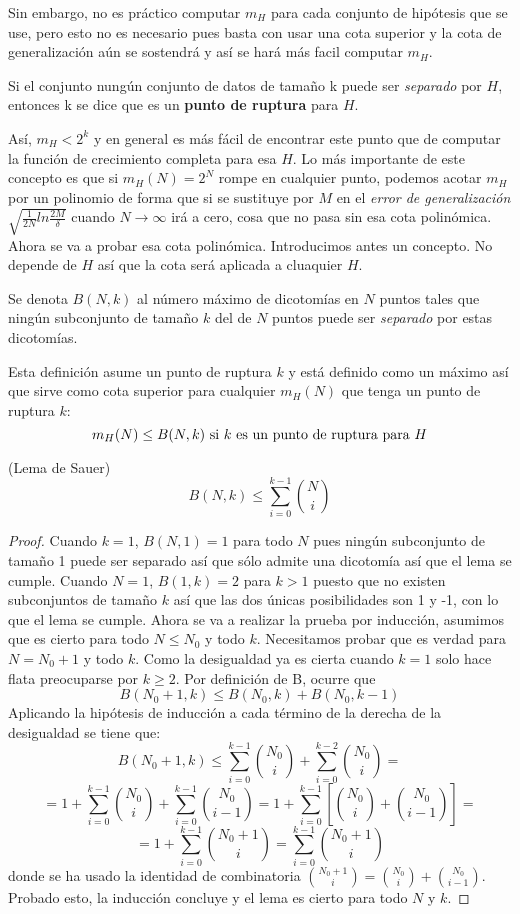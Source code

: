 Sin embargo, no es práctico computar $m_{H}$ para cada conjunto de hipótesis que se use, pero esto no es necesario pues basta con usar una cota superior y la cota de generalización aún se sostendrá y así se hará más facil computar $m_{H}$. \cite{abu2012learning}
\begin{definicion}
Si el conjunto nungún conjunto de datos de tamaño k puede ser \textit{separado} por $H$, entonces k se dice que es un \textbf{punto de ruptura} para $H$.
\end{definicion}
Así, $m_{H} < 2^{k}$ y en general es más fácil de encontrar este punto que de computar la función de crecimiento completa para esa $H$. Lo más importante de este concepto es que si $m_{H}(N)=2^{N}$ rompe en cualquier punto, podemos acotar $m_{H}$ por un polinomio de forma que si se sustituye por $M$ en el \textit{error de generalización} $\sqrt{\frac{1}{2N}ln\frac{2M}{\delta}}$ cuando $N \longrightarrow \infty$ irá a cero, cosa que no pasa sin esa cota polinómica.\\
Ahora se va a probar esa cota polinómica. Introducimos antes un concepto. No depende de $H$ así que la cota será aplicada a cluaquier $H$.
\begin{definicion}
Se denota $B(N,k)$ al número máximo de dicotomías en $N$ puntos tales que ningún subconjunto de tamaño $k$ del de $N$ puntos puede ser \textit{separado} por estas dicotomías.
\end{definicion}
Esta definición asume un punto de ruptura $k$ y está definido como un máximo así que sirve como cota superior para cualquier $m_{H}(N)$ que tenga un punto de ruptura $k$:
\[ m_{H}(N) \leq B(N,k) \textnormal{ si } k \textnormal{ es un punto de ruptura para } H\]
\begin{lema}
(Lema de Sauer) \[ B(N,k) \leq \sum_{i=0}^{k-1} \binom{N}{i} \]
\end{lema}
\begin{proof}
Cuando $k=1$, $B(N,1)=1$ para todo $N$ pues ningún subconjunto de tamaño 1 puede ser separado así que sólo admite una dicotomía así que el lema se cumple. Cuando $N=1$, $B(1,k)=2$ para $k>1$ puesto que no existen subconjuntos de tamaño $k$ así que las dos únicas posibilidades son 1 y -1, con lo que el lema se cumple. Ahora se va a realizar la prueba por inducción, asumimos que es cierto para todo $N \leq N_{0}$ y todo $k$. Necesitamos probar que es verdad para $N=N_{0}+1$ y todo $k$. Como la desigualdad ya es cierta cuando $k=1$ solo hace flata preocuparse por $k \geq 2$. Por definición de B, ocurre que
\[ B(N_{0}+1,k) \leq B(N_{0},k)+B(N_{0},k-1) \]
Aplicando la hipótesis de inducción a cada término de la derecha de la desigualdad se tiene que:
\[ B(N_{0}+1,k) \leq \sum_{i=0}^{k-1} \binom{N_{0}}{i} + \sum_{i=0}^{k-2} \binom{N_{0}}{i} =\] \[ = 1 + \sum_{i=0}^{k-1} \binom{N_{0}}{i} + \sum_{i=0}^{k-1} \binom{N_{0}}{i-1} = 1+ \sum_{i=0}^{k-1} \left[ \binom{N_{0}}{i} + \binom{N_{0}}{i-1} \right] = \] \[ = 1 + \sum_{i=0}^{k-1} \binom{N_{0} + 1}{i} = \sum_{i=0}^{k-1} \binom{N_{0}+1}{i}\]
donde se ha usado la identidad de combinatoria $\binom{N_{0}+1}{i} = \binom{N_{0}}{i}+\binom{N_{0}}{i-1}$. Probado esto, la inducción concluye y el lema es cierto para todo $N$ y $k$.
\end{proof}
